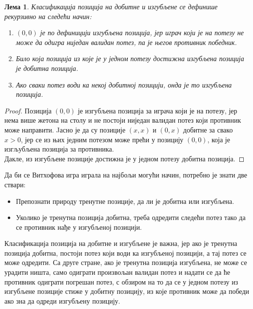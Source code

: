 \documentclass[a4paper]{article}
\newtheorem{lemma}{Лема}
\begin{document}
\begin{lemma}
	Класификација позиција на добитне и изгубљене се дефинише рекурзивно на следећи начин:
		\begin{enumerate}
			\item $ (0, 0) $ је по дефиницији изгубљена позиција, јер играч који је на потезу не може да одигра ниједан валидан потез, па је његов противник победник.
			\item Било која позиција из које је у једном потезу достижна изгубљена позиција је добитна позиција.
			\item Ако сваки потез води ка некој добитној позицији, онда је то изгубљена позиција.
		\end{enumerate}	
\end{lemma}

\begin{proof}
	Позиција $ (0, 0) $ је изгубљена позиција за играча који је на потезу, јер нема више жетона на столу и не постоји ниједан валидан потез који противник може направити. Jасно је да су позиције $ (x, x) $ и $ (0, x) $ добитне за свако $ x > 0 $,  јер се из њих једним потезом може прећи у позицију $ (0, 0) $, која је изгљубљена позиција за противника.\\
	Дакле, из изгубљене позиције достижна је у једном потезу добитна позиција.
\end{proof}

Да би се Витхофова игра играла на најбољи могући начин, потребно је знати две ствари:
\begin{itemize}
	\item Препознати природу тренутне позиције, да ли је добитна или изгубљена.
	\item Уколико је тренутна позиција добитна, треба одредити следећи потез тако да се противник нађе у изгубљеној позицији.
\end{itemize}

Класификација позиција на добитне и изгубљене је важна, јер ако је тренутна позиција добитна, постоји потез који води ка изгубљеној позицији, а тај потез се може одредити. Са друге стране, ако је тренутна позиција изгубљена, не може се урадити ништа, само одиграти произвољан валидан потез и надати се да ће противник одиграти погрешан потез, с обзиром на то да се у једном потезу из изгубљене позиције стиже у добитну позицију, из које противник може да победи ако зна да одреди изгубљену позицију. 
\end{document}
